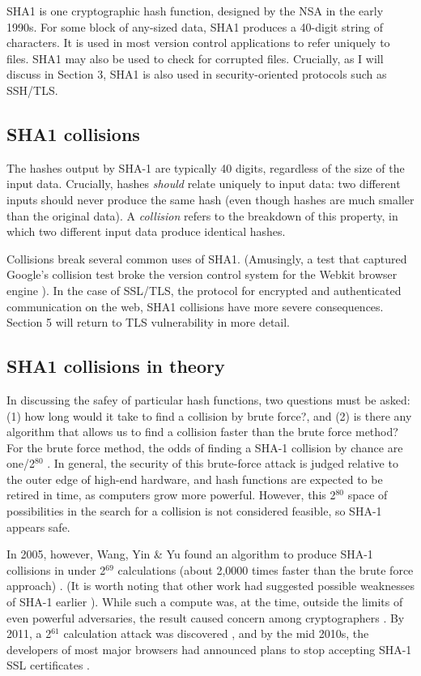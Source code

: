 \documentclass[sigconf]{acmart}
\begin{document}
SHA1 is one cryptographic hash function, designed by the NSA in the early 1990s.
For some block of any-sized data, SHA1 produces a 40-digit string of characters.
It is used in most version control applications to refer uniquely to files. SHA1 may also be used to check for corrupted files. 
Crucially, as I will discuss in Section 3, SHA1 is also used in security-oriented protocols such as SSH/TLS.


\subsection{SHA1 collisions}
\label{sec:org94f569a}

The hashes output by SHA-1 are typically 40 digits, regardless of the size of the input data.
Crucially, hashes \emph{should} relate uniquely to input data: 
two different inputs should never produce the same hash (even though hashes are much smaller than the original data).
A \emph{collision} refers to the breakdown of this property,
in which two different input data produce identical hashes.

Collisions break several common uses of SHA1. 
(Amusingly, a test that captured Google's collision test broke the version control system for the Webkit browser engine \cite{Koivisto2017}).
In the case of SSL/TLS, the protocol for encrypted and authenticated communication on the web, SHA1 collisions have more severe consequences.
Section 5 will return to TLS vulnerability in more detail.

\subsection{SHA1 collisions in theory}
\label{sec:orga7a1b42}

In discussing the safey of particular hash functions, two questions must be asked:
(1) how long would it take to find a collision by brute force?, and 
(2) is there any algorithm that allows us to find a collision faster than the brute force method?
For the brute force method, the odds of finding a SHA-1 collision by chance are one/2\(^{\text{80}}\)
\cite{Schneier2005}.
In general, the security of this brute-force attack is judged relative to the outer edge of high-end hardware, and hash functions are expected to be retired in time, as computers grow more powerful.
However, this 2\(^{\text{80}}\) space of possibilities in the search for a collision is not considered feasible, so SHA-1 appears safe.

In 2005, however, Wang, Yin \& Yu found an algorithm to produce SHA-1 collisions in under 2\(^{\text{69}}\) calculations (about 2,0000 times faster than the brute force approach)
\cite{Wang2005}.
(It is worth noting that other work had suggested possible weaknesses of SHA-1 earlier \cite{Biham2005}).
While such a compute was, at the time, outside the limits of even powerful adversaries,
the result caused concern among cryptographers \cite{Schneier2005}.
By 2011, a 2\(^{\text{61}}\) calculation attack was discovered \cite{Stevens2013a},
and by the mid 2010s, the developers of most major browsers had announced plans to stop accepting SHA-1 SSL certificates 
\cite{Mozilla2017,Sleevi2014}.
\end{document}
